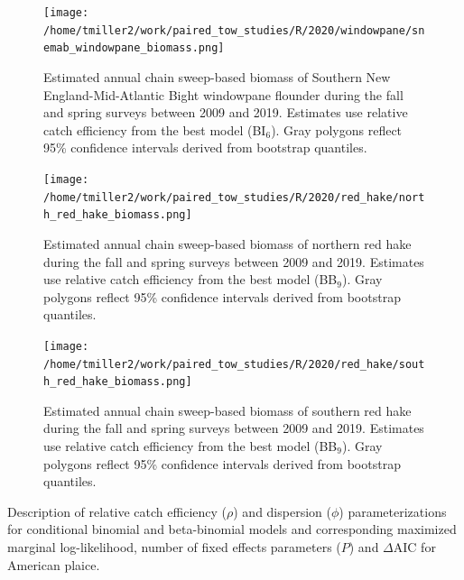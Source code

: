 \documentclass[12pt,letterpaper, leqno]{article}
\def\Little{\fontsize{10pt}{10pt}\selectfont}
\begin{document}
\begin{figure}
\caption{Estimated annual chain sweep-based biomass of Southern New England-Mid-Atlantic Bight windowpane flounder during the fall and spring surveys between 2009 and 2019. Estimates use relative catch efficiency from the best model (BI$_6$). Gray polygons reflect 95\% confidence intervals derived from bootstrap quantiles.}\label{snemab_windowpane_biomass}
\begin{center}
\texttt{[image: /home/tmiller2/work/paired\_tow\_studies/R/2020/windowpane/snemab\_windowpane\_biomass.png]}
\end{center}
\end{figure}

\begin{figure}
\caption{Estimated annual chain sweep-based biomass of northern red hake during the fall and spring surveys between 2009 and 2019. Estimates use relative catch efficiency from the best model (BB$_9$). Gray polygons reflect 95\% confidence intervals derived from bootstrap quantiles.}\label{north_red_hake_biomass}
\begin{center}
\texttt{[image: /home/tmiller2/work/paired\_tow\_studies/R/2020/red\_hake/north\_red\_hake\_biomass.png]}
\end{center}
\end{figure}

\begin{figure}
\caption{Estimated annual chain sweep-based biomass of southern red hake during the fall and spring surveys between 2009 and 2019. Estimates use relative catch efficiency from the best model (BB$_9$). Gray polygons reflect 95\% confidence intervals derived from bootstrap quantiles.}\label{south_red_hake_biomass}
\begin{center}
\texttt{[image: /home/tmiller2/work/paired\_tow\_studies/R/2020/red\_hake/south\_red\_hake\_biomass.png]}
\end{center}
\end{figure}



%

\begin{landscape}
\begin{table}\caption{Description of relative catch efficiency ($\rho$) and dispersion ($\phi$) parameterizations for conditional binomial and beta-binomial models and corresponding maximized marginal log-likelihood, number of fixed effects parameters ($P$) and $\Delta$AIC for American plaice.}\label{models_table_plaice}
{\Little  }
\end{table}
\end{landscape}
\end{document}
